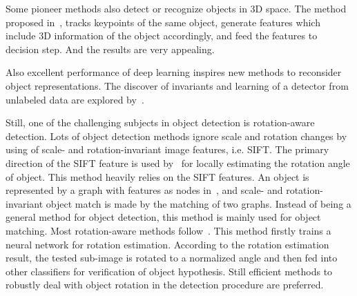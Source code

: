 Some pioneer methods also detect or recognize objects in 3D space. The method proposed in~\citep{r3d}, tracks keypoints of the same object, generate features which include 3D information of the object accordingly, and feed the features to decision step. And the results are very appealing.

Also excellent performance of deep learning inspires new methods to reconsider   object representations. The discover of invariants and learning of a detector from unlabeled data are explored by~\citep{dnnnn}.


Still, one of the challenging subjects in object detection is rotation-aware detection. Lots of object detection methods ignore scale and rotation changes by using of scale- and rotation-invariant image features, i.e. SIFT.
The primary  direction of the SIFT feature is used by~\citep{ac21} for locally estimating the rotation angle of object. This method heavily relies on the SIFT features.
An object is represented by a graph with features as nodes in~\citep{ac222}, and scale- and rotation-invariant object match is made by the matching of two graphs. Instead of being a general method for object detection, this method is mainly used for object matching.
Most rotation-aware methods follow~\citep{ac20}. This method firstly trains a neural network for rotation estimation. According to the rotation estimation result, the tested sub-image is rotated to a normalized angle and then fed into other classifiers for verification of object hypothesis. Still efficient methods to robustly deal with object rotation in the detection procedure are preferred.




\begin{comment}
(a) a well-de?ned closed boundary
in space; (b) a different appearance from their surroundings [23, 25]; (c) sometimes it is unique within the image
and stands out as salient
\end{comment}

